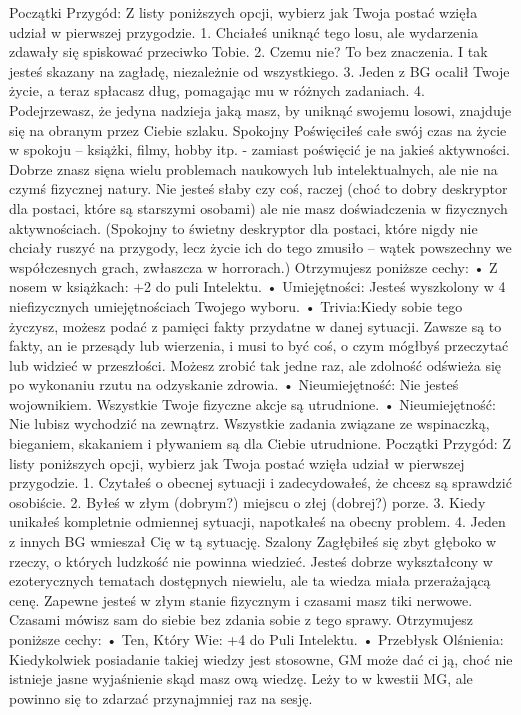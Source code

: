 Początki Przygód: Z listy poniższych opcji, wybierz jak Twoja postać wzięła udział w pierwszej przygodzie.
1. Chciałeś uniknąć tego losu, ale wydarzenia zdawały się spiskować przeciwko Tobie.
2. Czemu nie? To bez znaczenia. I tak jesteś skazany na zagładę, niezależnie od wszystkiego.
3. Jeden z BG ocalił Twoje życie, a teraz spłacasz dług, pomagając mu w różnych zadaniach.
4. Podejrzewasz, że jedyna nadzieja jaką masz, by uniknąć swojemu losowi, znajduje się na obranym przez Ciebie szlaku.
Spokojny
Poświęciłeś całe swój czas na życie w spokoju – książki, filmy, hobby itp. - zamiast poświęcić je na jakieś aktywności. Dobrze znasz sięna wielu problemach naukowych lub intelektualnych, ale nie na czymś fizycznej natury. Nie jesteś słaby czy coś, raczej (choć to dobry deskryptor dla postaci, które są starszymi osobami) ale nie masz doświadczenia w fizycznych aktywnościach.
(Spokojny to świetny deskryptor dla postaci, które nigdy nie chciały ruszyć na przygody, lecz życie ich do tego zmusiło – wątek powszechny we współczesnych grach, zwłaszcza w horrorach.)
Otrzymujesz poniższe cechy:
    • Z nosem w książkach: +2 do puli Intelektu.
    • Umiejętności: Jesteś wyszkolony w 4 niefizycznych umiejętnościach Twojego wyboru.
    • Trivia:Kiedy sobie tego życzysz, możesz podać z pamięci fakty przydatne w danej sytuacji. Zawsze są to fakty, an ie przesądy lub wierzenia, i musi to być coś, o czym mógłbyś przeczytać lub widzieć w przeszłości. Możesz zrobić tak jedne raz, ale zdolność odświeża się po wykonaniu rzutu na odzyskanie zdrowia.
    • Nieumiejętność: Nie jesteś wojownikiem. Wszystkie Twoje fizyczne akcje są utrudnione. 
    • Nieumiejętność: Nie lubisz wychodzić na zewnątrz. Wszystkie zadania związane ze wspinaczką, bieganiem, skakaniem i pływaniem są dla Ciebie utrudnione.
Początki Przygód: Z listy poniższych opcji, wybierz jak Twoja postać wzięła udział w pierwszej przygodzie.
1. Czytałeś o obecnej sytuacji i zadecydowałeś, że chcesz są sprawdzić osobiście.
2. Byłeś w złym (dobrym?) miejscu o złej (dobrej?) porze.
3. Kiedy unikałeś kompletnie odmiennej sytuacji, napotkałeś na obecny problem.
4. Jeden z innych BG wmieszał Cię w tą sytuację.
Szalony
Zagłębiłeś się zbyt głęboko w rzeczy, o których ludzkość nie powinna wiedzieć. Jesteś dobrze wykształcony w ezoterycznych tematach dostępnych niewielu, ale ta wiedza miała przerażającą cenę. Zapewne jesteś w złym stanie fizycznym i czasami masz tiki nerwowe. Czasami mówisz sam do siebie bez zdania sobie z tego sprawy.
Otrzymujesz poniższe cechy:
    • Ten, Który Wie: +4 do Puli Intelektu.
    • Przebłysk Olśnienia: Kiedykolwiek posiadanie takiej wiedzy jest stosowne, GM może dać ci ją, choć nie istnieje jasne wyjaśnienie skąd masz ową wiedzę. Leży to w kwestii MG, ale powinno się to zdarzać przynajmniej raz na sesję.
